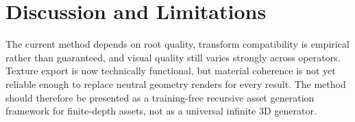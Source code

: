 \documentclass[sigconf,anonymous,review]{acmart}
\begin{document}
\section{Discussion and Limitations}

The current method depends on root quality, transform compatibility is empirical rather than guaranteed, and visual quality still varies strongly across operators. Texture export is now technically functional, but material coherence is not yet reliable enough to replace neutral geometry renders for every result. The method should therefore be presented as a training-free recursive asset generation framework for finite-depth assets, not as a universal infinite 3D generator.



\end{document}
